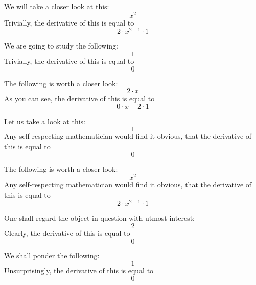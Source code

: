 \documentclass{article}
\begin{document}
We will take a closer look at this:
\begin{equation}
x ^{2 } 
\end{equation}
Trivially, the derivative of this is equal to
\begin{equation}
2 \cdot x ^{2 - 1 } \cdot 1 
\end{equation}

We are going to study the following:
\begin{equation}
1 
\end{equation}
Trivially, the derivative of this is equal to
\begin{equation}
0 
\end{equation}

The following is worth a closer look:
\begin{equation}
2 \cdot x 
\end{equation}
As you can see, the derivative of this is equal to
\begin{equation}
0 \cdot x + 2 \cdot 1 
\end{equation}

Let us take a look at this:
\begin{equation}
1 
\end{equation}
Any self-respecting mathematician would find it obvious, that the derivative of this is equal to
\begin{equation}
0 
\end{equation}

The following is worth a closer look:
\begin{equation}
x ^{2 } 
\end{equation}
Any self-respecting mathematician would find it obvious, that the derivative of this is equal to
\begin{equation}
2 \cdot x ^{2 - 1 } \cdot 1 
\end{equation}

One shall regard the object in question with utmost interest:
\begin{equation}
2 
\end{equation}
Clearly, the derivative of this is equal to
\begin{equation}
0 
\end{equation}

We shall ponder the following:
\begin{equation}
1 
\end{equation}
Unsurprisingly, the derivative of this is equal to
\begin{equation}
0 
\end{equation}
\end{document}
